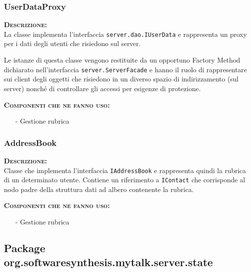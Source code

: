\subsubsection{UserDataProxy}
\begin{description}
  \item{\scshape\bfseries Descrizione:}\\
La classe implementa l'interfaccia \texttt{server.dao.IUserData} e rappresenta un proxy per i dati degli utenti che risiedono sul server.

Le istanze di questa classe vengono restituite da un opportuno Factory Method dichiarato nell'interfaccia \texttt{server.ServerFacade} e hanno il ruolo di rappresentare sui client degli oggetti che risiedono in un diverso spazio di indirizzamento (sul server) nonché di controllare gli accessi per esigenze di protezione.
  \item{\scshape\bfseries Componenti che ne fanno uso:}
  \begin{itemize}[noitemsep,nolistsep]
    \item[-] Gestione rubrica
  \end{itemize}
\end{description}

\subsubsection{AddressBook}
\begin{description}
	\item{\scshape\bfseries Descrizione:}\\
Classe che implementa l'interfaccia \texttt{IAddressBook} e rappresenta quindi la rubrica di un determinato utente. Contiene un riferimento a \texttt{IContact} che corrisponde al nodo padre della struttura dati ad albero contenente la rubrica.
	\item{\scshape\bfseries Componenti che ne fanno uso:}
	\begin{itemize}[noitemsep,nolistsep]
	  \item[-] Gestione rubrica
	\end{itemize}
\end{description}

\subsection{Package org.softwaresynthesis.mytalk.server.state}
